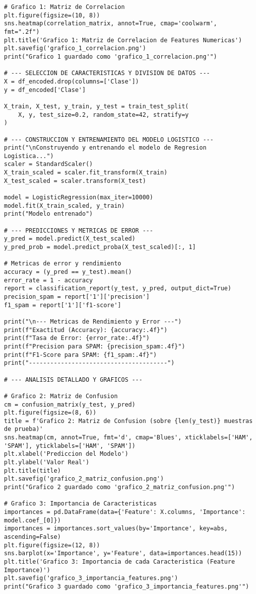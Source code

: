 \documentclass[12pt,a4paper]{article}
\begin{document}
\begin{lstlisting}
# Grafico 1: Matriz de Correlacion
plt.figure(figsize=(10, 8))
sns.heatmap(correlation_matrix, annot=True, cmap='coolwarm', fmt=".2f")
plt.title('Grafico 1: Matriz de Correlacion de Features Numericas')
plt.savefig('grafico_1_correlacion.png')
print("Grafico 1 guardado como 'grafico_1_correlacion.png'")

# --- SELECCION DE CARACTERISTICAS Y DIVISION DE DATOS ---
X = df_encoded.drop(columns=['Clase'])
y = df_encoded['Clase']

X_train, X_test, y_train, y_test = train_test_split(
    X, y, test_size=0.2, random_state=42, stratify=y
)

# --- CONSTRUCCION Y ENTRENAMIENTO DEL MODELO LOGISTICO ---
print("\nConstruyendo y entrenando el modelo de Regresion Logistica...")
scaler = StandardScaler()
X_train_scaled = scaler.fit_transform(X_train)
X_test_scaled = scaler.transform(X_test)

model = LogisticRegression(max_iter=10000)
model.fit(X_train_scaled, y_train)
print("Modelo entrenado")

# --- PREDICCIONES Y METRICAS DE ERROR ---
y_pred = model.predict(X_test_scaled)
y_pred_prob = model.predict_proba(X_test_scaled)[:, 1]

# Metricas de error y rendimiento
accuracy = (y_pred == y_test).mean()
error_rate = 1 - accuracy
report = classification_report(y_test, y_pred, output_dict=True)
precision_spam = report['1']['precision']
f1_spam = report['1']['f1-score']

print("\n--- Metricas de Rendimiento y Error ---")
print(f"Exactitud (Accuracy): {accuracy:.4f}")
print(f"Tasa de Error: {error_rate:.4f}")
print(f"Precision para SPAM: {precision_spam:.4f}")
print(f"F1-Score para SPAM: {f1_spam:.4f}")
print("---------------------------------------")

# --- ANALISIS DETALLADO Y GRAFICOS ---

# Grafico 2: Matriz de Confusion
cm = confusion_matrix(y_test, y_pred)
plt.figure(figsize=(8, 6))
title = f'Grafico 2: Matriz de Confusion (sobre {len(y_test)} muestras de prueba)'
sns.heatmap(cm, annot=True, fmt='d', cmap='Blues', xticklabels=['HAM', 'SPAM'], yticklabels=['HAM', 'SPAM'])
plt.xlabel('Prediccion del Modelo')
plt.ylabel('Valor Real')
plt.title(title)
plt.savefig('grafico_2_matriz_confusion.png')
print("Grafico 2 guardado como 'grafico_2_matriz_confusion.png'")

# Grafico 3: Importancia de Caracteristicas
importances = pd.DataFrame(data={'Feature': X.columns, 'Importance': model.coef_[0]})
importances = importances.sort_values(by='Importance', key=abs, ascending=False)
plt.figure(figsize=(12, 8))
sns.barplot(x='Importance', y='Feature', data=importances.head(15))
plt.title('Grafico 3: Importancia de cada Caracteristica (Feature Importance)')
plt.savefig('grafico_3_importancia_features.png')
print("Grafico 3 guardado como 'grafico_3_importancia_features.png'")


\end{lstlisting}
\end{document}
